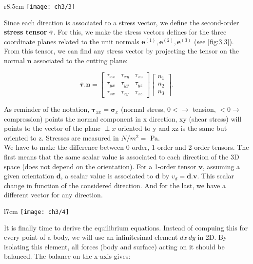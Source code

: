 		\begin{wrapfigure}[8]{r}{8.5cm}
		\vspace{-5mm}	
		\texttt{[image: ch3/3]}
		\label{fig:3.3}
		\end{wrapfigure}		
		Since each direction is associated to a stress vector, we define the second-order \textbf{stress tensor} $\bm{\bar{\bar{\tau}}}$. For this, we make the stress vectors defines for the three coordinate planes related to the unit normals $\bm{e}^{(1)}, \bm{e}^{(2)}, \bm{e}^{(3)}$ (see \autoref{fig:3.3}). From this tensor, we can find any stress vector by projecting the tensor on the normal $\bm{n}$ associated to the cutting plane:
		
		\begin{equation}
			\bm{\bar{\bar{\tau}}. n} = 
			\left[
			\begin{array}{ccc}
			\tau _{xx} & \tau _{xy} & \tau _{xz}\\
			\tau _{yx} & \tau _{yy} & \tau _{yz}\\
			\tau _{zx} & \tau _{zy} & \tau _{zz}
			\end{array}
			\right]
			\left[
			\begin{array}{c}
			n_1\\
			n_2\\
			n_3
			\end{array}
			\right].
		\end{equation}
		
		As reminder of the notation, $\bm{\tau} _{xx} = \bm{\sigma} _x$ (normal stress, $0<\rightarrow$ tension, $<0 \rightarrow$ compression) points the normal component in x direction, xy (shear stress) will points to the vector of the plane $\perp x$ oriented to y and xz is the same but oriented to z. Stresses are measured in $N/m^2 =$ Pa.\\
		
		We have to make the difference between 0-order, 1-order and 2-order tensors. The first means that the same scalar value is associated to each direction of the 3D space (does not depend on the orientation). For a 1-order tensor $\bm{v}$, assuming a given orientation $\bm{d}$, a scalar value is associated to $\bm{d}$ by $v_d = \bm{d}.\bm{v}$. This scalar change in function of the considered direction. And for the last, we have a different vector for any direction. \\
		
		\begin{wrapfigure}[8]{l}{7cm}
		\vspace{-10mm}	
		\texttt{[image: ch3/4]}
		\end{wrapfigure}		
		It is finally time to derive the equilibrium equations. Instead of compuing this for every point of a body, we will use an infinitesimal element $dx\, dy$ in 2D. By isolating this element, all forces (body and surface) acting on it should be balanced.  The balance on the x-axis gives:\\
		
